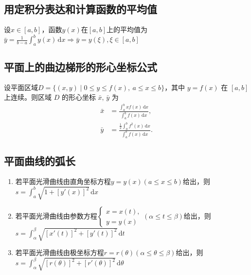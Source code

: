 \documentclass[a4paper,12pt]{article}
\begin{document}
    \subsection{用定积分表达和计算函数的平均值}

    设$x \in [a, b]$，函数$y(x)$在$[a, b]$上的平均值为$\bar{y} = \displaystyle\frac{1}{b - a}\int_a^b y(x)\,\mathrm{d}x \Rightarrow \bar{y} = y(\xi), \xi \in [a, b]$

    \subsection{平面上的曲边梯形的形心坐标公式}

    设平面区域$D = \{(x, y) \mid 0 \le y \le f(x),\ a \le x \le b\}$，其中 $y = f(x)$ 在 $[a,b]$ 上连续。则区域 $D$ 的形心坐标 $\bar{x},\,\bar{y}$ 为
    \[
        \begin{aligned}
            \bar{x}
            &=
            \frac{\displaystyle\int_a^b x f(x)\,\mathrm{d}x}
            {\displaystyle\int_a^b f(x)\,\mathrm{d}x},
            \\[8pt]
            \bar{y}
            &=
            \frac{\displaystyle\frac{1}{2}\int_a^b f^2(x)\,\mathrm{d}x}
            {\displaystyle\int_a^b f(x)\,\mathrm{d}x}.
        \end{aligned}
    \]

    \subsection{平面曲线的弧长}

    \begin{enumerate}
        \item 若平面光滑曲线由直角坐标方程$y = y(x)(a \leq x \leq b)$给出，则$s = \displaystyle\int_a^b \sqrt {1 + [y'(x)]^2}\,\mathrm{d}x$
        \item 若平面光滑曲线由参数方程$\begin{cases}
                                           x = x(t), \\
                                           y = y(x)
        \end{cases}(\alpha \leq t \leq \beta)$给出，则$s = \displaystyle\int_{\alpha}^{\beta} \sqrt {[x'(t)]^2 + [y'(t)]^2}\,\mathrm{d}t$
        \item 若平面光滑曲线由极坐标方程$r = r(\theta)(\alpha \leq \theta \leq \beta)$给出，则$s = \displaystyle\int_{\alpha}^{\beta} \sqrt {[r(\theta)]^2 + [r'(\theta)]^2}\,\mathrm{d}\theta$
    \end{enumerate}
\end{document}
